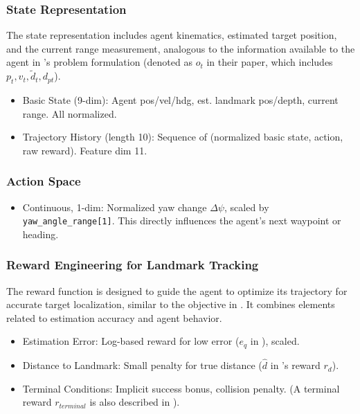 \documentclass[11pt,a4paper]{article}
\newcommand{\code}[1]{\texttt{#1}} %
\begin{document}
\subsubsection{State Representation}
The state representation includes agent kinematics, estimated target position, and the current range measurement, analogous to the information available to the agent in \cite{masmitja2023tracking}'s problem formulation (denoted as $o_t$ in their paper, which includes $p_t, v_t, \tilde{d}_t, d_{pt}$).
\begin{itemize}
    \item Basic State (9-dim): Agent pos/vel/hdg, est. landmark pos/depth, current range. All normalized.
    \item Trajectory History (length 10): Sequence of (normalized basic state, action, raw reward). Feature dim 11.
\end{itemize}

\subsubsection{Action Space}
\begin{itemize}
    \item Continuous, 1-dim: Normalized yaw change $\Delta\psi$, scaled by \code{yaw\_angle\_range[1]}. This directly influences the agent's next waypoint or heading.
\end{itemize}

\subsubsection{Reward Engineering for Landmark Tracking}
The reward function is designed to guide the agent to optimize its trajectory for accurate target localization, similar to the objective in \cite{masmitja2023tracking}. It combines elements related to estimation accuracy and agent behavior.
\begin{itemize}
    \item Estimation Error: Log-based reward for low error ($e_q$ in \cite{masmitja2023tracking}), scaled.
    \item Distance to Landmark: Small penalty for true distance ($\hat{d}$ in \cite{masmitja2023tracking}'s reward $r_d$).
    \item Terminal Conditions: Implicit success bonus, collision penalty. (A terminal reward $r_{terminal}$ is also described in \cite{masmitja2023tracking}).
\end{itemize}
\end{document}
